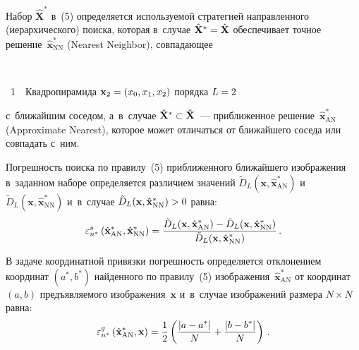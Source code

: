 \begin{multicols}{2}
  Набор $\hat{\mathbf{X}}^*$ в~(5) определяется используемой стратегией 
направленного (иерархического) поиска, которая в~случае 
$\hat{\mathbf{X}}^*\hm=\hat{\mathbf{X}}$ обеспечивает точное 
решение~$\hat{\mathbf{x}}^*_{\mathrm{NN}}$ (Nearest Neighbor), 
совпадающее\linebreak\vspace*{-12pt}

 { \begin{center}  %
 \vspace*{1pt}
 \mbox{%
\epsfxsize=70.052mm
}


\vspace*{9pt}


\noindent
{{\figurename~1}\ \ \small{Квадропирамида $\mathbf{x}_2\hm=\left( x_0, x_1, x_2\right)$ порядка $L\hm=2$}}
\end{center}
}


\addtocounter{figure}{1}



\noindent
 с~ближайшим соседом, а~в~случае $\hat{\mathbf{X}}^*\hm\subset 
\hat{\mathbf{X}}$~--- приближенное 
решение~$\hat{\mathbf{x}}^*_{\mathrm{AN}}$ (Approximate Nearest), которое 
может отличаться от ближайшего соседа или совпадать с~ним. 

Погрешность поиска по правилу~(5) приближенного ближайшего изображения 
в~заданном наборе определяется различием значений $\tilde{D}_L(\mathbf{x}, 
\hat{\mathbf{x}}^*_{\mathrm{AN}})$ и~$\tilde{D}_L(\mathbf{x}, 
\hat{\mathbf{x}}^*_{\mathrm{NN}})$ и~в~случае $\tilde{D}_L(\mathbf{x}, 
\hat{\mathbf{x}}^*_{\mathrm{NN}})\hm >0$ равна:
\begin{equation}
\varepsilon^s_{n^*} \left( \hat{\mathbf{x}}^*_{\mathrm{AN}}, 
\hat{\mathbf{x}}^*_{\mathrm{NN}}\right) = 
\displaystyle\frac{\displaystyle \tilde{D}_L(\mathbf{x},\hat{\mathbf{x}}^*_{\mathrm{AN}})- 
\tilde{D}_L(\mathbf{x},\hat{\mathbf{x}}^*_{\mathrm{NN}})\mathstrut}{\displaystyle \tilde{D}_L(\mathbf{x},\hat{\mathbf{x}}^*_{\mathrm{NN}})\mathstrut}\,.
\label{e6-lan}
\end{equation}
  
  В задаче координатной привязки погрешность определяется отклонением 
координат $(a^*, b^*)$ найден\-но\-го по правилу~(5) 
изображения~$\hat{\mathbf{x}}^*_{\mathrm{AN}}$ от координат~$(a,b)$ 
предъявляемого изображения~$\mathbf{x}$ и~в~случае изображений размера 
$N\times N$ равна: 
  \begin{equation}
  \varepsilon^g_{n^*}\left( \hat{\mathbf{x}}^*_{\mathrm{AN}}, \mathbf{x}\right) 
=\displaystyle\frac{\displaystyle 1\mathstrut}{\displaystyle 2\mathstrut}\left( \displaystyle\frac{\displaystyle |a-a^*|\mathstrut}{\displaystyle N\mathstrut}+\displaystyle\frac{\displaystyle |b-b^*|\mathstrut}{\displaystyle N\mathstrut}\right)\,.
  \label{e7-lan}
  \end{equation}
  

\end{multicols}

